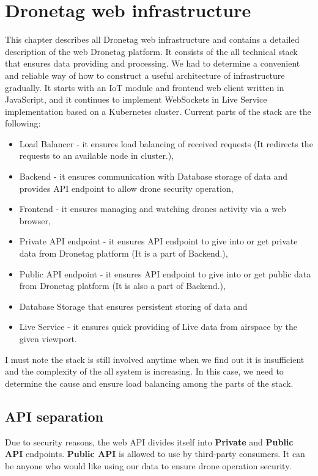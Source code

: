 \chapter{Dronetag web infrastructure}\label{ch:dronetag-web-infrastructure}
This chapter describes all Dronetag web infrastructure and contains a detailed description of the web Dronetag platform.
It consists of the all technical stack that ensures data providing and processing.
We had to determine a convenient and reliable way of how to construct a useful architecture of infrastructure gradually.
It starts with an IoT module and frontend web client written in JavaScript, and it continues to implement WebSockets in Live Service implementation based on a Kubernetes cluster.
Current parts of the stack are the following:
\begin{itemize}
    \item Load Balancer - it ensures load balancing of received requests (It redirects the requests to an available node in cluster.),
    \item Backend - it ensures communication with Database storage of data and provides API endpoint to allow drone security operation,
    \item Frontend - it ensures managing and watching drones activity via a web browser,
    \item Private API endpoint - it ensures API endpoint to give into or get private data from Dronetag platform (It is a part of Backend.),
    \item Public API endpoint - it ensures API endpoint to give into or get public data from Dronetag platform (It is also a part of Backend.),
    \item Database Storage that ensures persistent storing of data and
    \item Live Service - it ensures quick providing of Live data from airspace by the given viewport.
\end{itemize}
I must note the stack is still involved anytime when we find out it is insufficient and the complexity of the all system is increasing.
In this case, we need to determine the cause and ensure load balancing among the parts of the stack.

\section{API separation}\label{sec:api-separation}
Due to security reasons, the web API divides itself into \textbf{Private} and \textbf{Public API} endpoints.
\textbf{Public API} is allowed to use by third-party consumers.
It can be anyone who would like using our data to ensure drone operation security.

